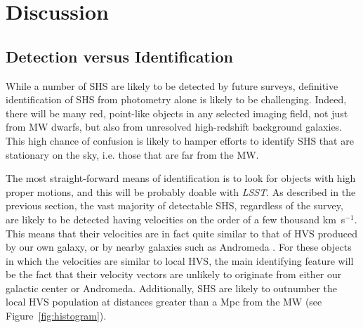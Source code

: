 \documentclass[a4paper,twocolumn]{emulateapj}
\begin{document}
{\section{Discussion}\label{sec:discussion}

\subsection{Detection versus Identification}\label{sec:ident}
While a number of SHS are likely to be detected by future surveys, definitive identification of SHS from photometry alone is likely to be challenging. Indeed, there will be many red, point-like objects in any selected imaging field, not just from MW dwarfs, but also from unresolved high-redshift background galaxies. This high chance of confusion is likely to hamper efforts to identify SHS that are stationary on the sky, i.e. those that are far from the MW.

The most straight-forward means of identification is to look for objects with high proper motions, and this will be probably doable with {\it LSST}. As described in the previous section, the vast majority of detectable SHS, regardless of the survey, are likely to be detected having velocities on the order of a few thousand km~s$^{-1}$. This means that their velocities are in fact quite similar to that of HVS produced by our own galaxy, or by nearby galaxies such as Andromeda \citep{Sherwin:2008a}. For these objects in which the velocities are similar to local HVS, the main identifying feature will be the fact that their velocity vectors are unlikely to originate from either our galactic center or Andromeda. Additionally, SHS are likely to outnumber the local HVS population at distances greater than a Mpc from the MW (see Figure~\ref{fig:histogram}).

}
\end{document}
